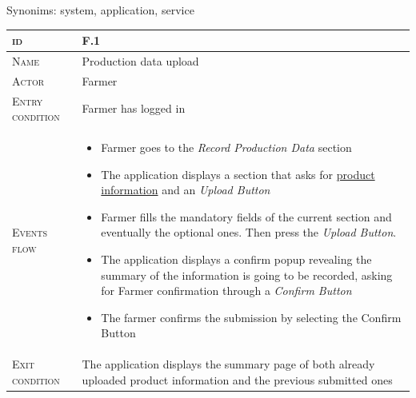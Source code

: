 Synonims: system, application, service



\begin{table}[H]
    \centering
    \begin{tabular}[c]{|l|p{}|}
        \hline %
    	\textsc{id}                 &   F.1\\
    	\hline %
    	\textsc{Name}               &   Production data upload\\
    	\hline %
    	\textsc{Actor}             &   Farmer\\
    	\hline %
    	\textsc{Entry condition}   &   Farmer has logged in\\
    	\hline %
    	\textsc{Events flow}         &   %
            	                        \begin{itemize}
                                    	    \item Farmer goes to the \textit{Record Production Data} section
                                    		\item The application displays a section that asks for \hyperref[tab:definitionsTable]{product information} and an \textit{Upload Button}
                                    		\item Farmer fills the mandatory fields of the current section and eventually the optional ones. Then press the \textit{Upload Button}.
                                    		\item The application displays a confirm popup revealing the summary of the information is going to be recorded, asking for Farmer confirmation through a \textit{Confirm Button}
                                    		\item The farmer confirms the submission by selecting the Confirm Button
                                        \end{itemize}\\
        \hline %
        \textsc{Exit condition}    &  The application displays the summary page of both already uploaded product information and the previous submitted ones\\

\end{tabular}
\end{table}

